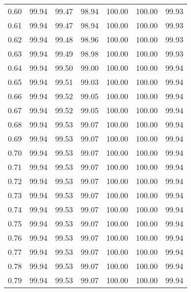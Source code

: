 \begin{tabular}{|c|c|c|c|c|c|c|}
      0.60 &     99.94 &     99.47 &      98.94 &  100.00 &     100.00 &         99.93 \\
      0.61 &     99.94 &     99.47 &      98.94 &  100.00 &     100.00 &         99.93 \\
      0.62 &     99.94 &     99.48 &      98.96 &  100.00 &     100.00 &         99.93 \\
      0.63 &     99.94 &     99.49 &      98.98 &  100.00 &     100.00 &         99.93 \\
      0.64 &     99.94 &     99.50 &      99.00 &  100.00 &     100.00 &         99.94 \\
      0.65 &     99.94 &     99.51 &      99.03 &  100.00 &     100.00 &         99.94 \\
      0.66 &     99.94 &     99.52 &      99.05 &  100.00 &     100.00 &         99.94 \\
      0.67 &     99.94 &     99.52 &      99.05 &  100.00 &     100.00 &         99.94 \\
      0.68 &     99.94 &     99.53 &      99.07 &  100.00 &     100.00 &         99.94 \\
      0.69 &     99.94 &     99.53 &      99.07 &  100.00 &     100.00 &         99.94 \\
      0.70 &     99.94 &     99.53 &      99.07 &  100.00 &     100.00 &         99.94 \\
      0.71 &     99.94 &     99.53 &      99.07 &  100.00 &     100.00 &         99.94 \\
      0.72 &     99.94 &     99.53 &      99.07 &  100.00 &     100.00 &         99.94 \\
      0.73 &     99.94 &     99.53 &      99.07 &  100.00 &     100.00 &         99.94 \\
      0.74 &     99.94 &     99.53 &      99.07 &  100.00 &     100.00 &         99.94 \\
      0.75 &     99.94 &     99.53 &      99.07 &  100.00 &     100.00 &         99.94 \\
      0.76 &     99.94 &     99.53 &      99.07 &  100.00 &     100.00 &         99.94 \\
      0.77 &     99.94 &     99.53 &      99.07 &  100.00 &     100.00 &         99.94 \\
      0.78 &     99.94 &     99.53 &      99.07 &  100.00 &     100.00 &         99.94 \\
      0.79 &     99.94 &     99.53 &      99.07 &  100.00 &     100.00 &         99.94 \\

\end{tabular}
